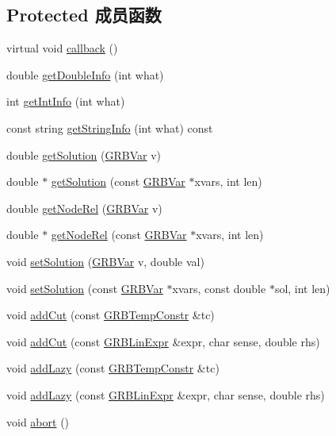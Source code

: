 \subsection*{Protected 成员函数}
\begin{DoxyCompactItemize}
\item 
virtual void \hyperlink{classGRBCallback_ac98d2ce2e5f33f78aea23ef181182218}{callback} ()
\item 
double \hyperlink{classGRBCallback_a78e47638aed52d436681c681feb5b8ed}{get\+Double\+Info} (int what)
\item 
int \hyperlink{classGRBCallback_a5779181f8925fa6a62340a9ca0827b68}{get\+Int\+Info} (int what)
\item 
const string \hyperlink{classGRBCallback_a6fe2420d0dd1016d15c49b720b50586c}{get\+String\+Info} (int what) const 
\item 
double \hyperlink{classGRBCallback_a11d706f8c1665226cfe9c1b069570572}{get\+Solution} (\hyperlink{classGRBVar}{G\+R\+B\+Var} v)
\item 
double $\ast$ \hyperlink{classGRBCallback_a60bccb058cbb5f92ad51b12ca2f2777d}{get\+Solution} (const \hyperlink{classGRBVar}{G\+R\+B\+Var} $\ast$xvars, int len)
\item 
double \hyperlink{classGRBCallback_a7398903fc0268c9d3671ab3b1efcb66d}{get\+Node\+Rel} (\hyperlink{classGRBVar}{G\+R\+B\+Var} v)
\item 
double $\ast$ \hyperlink{classGRBCallback_a067e11497658188467fcd9779e4caace}{get\+Node\+Rel} (const \hyperlink{classGRBVar}{G\+R\+B\+Var} $\ast$xvars, int len)
\item 
void \hyperlink{classGRBCallback_abb80bff13130307439678f5254561806}{set\+Solution} (\hyperlink{classGRBVar}{G\+R\+B\+Var} v, double val)
\item 
void \hyperlink{classGRBCallback_aede79d20d33272f78f63bf62d411b25b}{set\+Solution} (const \hyperlink{classGRBVar}{G\+R\+B\+Var} $\ast$xvars, const double $\ast$sol, int len)
\item 
void \hyperlink{classGRBCallback_a86e7e676fecae748ba6f5c77a684e8b9}{add\+Cut} (const \hyperlink{classGRBTempConstr}{G\+R\+B\+Temp\+Constr} \&tc)
\item 
void \hyperlink{classGRBCallback_aac8fec59044c43ef7bc0ce7e24969d6b}{add\+Cut} (const \hyperlink{classGRBLinExpr}{G\+R\+B\+Lin\+Expr} \&expr, char sense, double rhs)
\item 
void \hyperlink{classGRBCallback_ae2ce7ec9da74305255efd554de16e507}{add\+Lazy} (const \hyperlink{classGRBTempConstr}{G\+R\+B\+Temp\+Constr} \&tc)
\item 
void \hyperlink{classGRBCallback_a9ecd912fb5de513e5826160dfca06edf}{add\+Lazy} (const \hyperlink{classGRBLinExpr}{G\+R\+B\+Lin\+Expr} \&expr, char sense, double rhs)
\item 
void \hyperlink{classGRBCallback_a2bc94f81dc5c8bc799fe4b51f795071a}{abort} ()
\end{DoxyCompactItemize}
